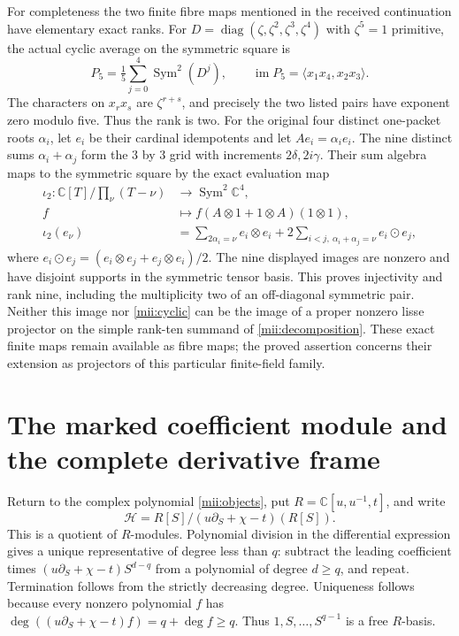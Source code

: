 \documentclass[11pt]{article}
\newcommand{\CC}{\mathbb C}
\newcommand{\Sym}{\operatorname{Sym}}
\newcommand{\im}{\operatorname{im}}
\newcommand{\diag}{\operatorname{diag}}
\begin{document}
For completeness the two finite fibre maps mentioned in the received
continuation have elementary exact ranks. For
$D=\diag(\zeta,\zeta^2,\zeta^3,\zeta^4)$ with $\zeta^5=1$ primitive,
the actual cyclic average on the symmetric square is
\begin{equation}\tag{MII14}\label{mii:cyclic}
 P_5=\tfrac15\sum_{j=0}^4\Sym^2(D^j),\qquad
 \im P_5=\langle x_1x_4,x_2x_3\rangle.
\end{equation}
The characters on $x_rx_s$ are $\zeta^{r+s}$, and precisely the
two listed pairs have exponent zero modulo five. Thus the rank is
two. For the original four distinct one-packet roots $\alpha_i$,
let $e_i$ be their cardinal idempotents and let $A e_i=\alpha_i e_i$.
The nine distinct sums $\alpha_i+\alpha_j$ form the $3$ by $3$
grid with increments $2\delta,2i\gamma$. Their sum algebra maps to
the symmetric square by the exact evaluation map
\begin{equation}\tag{MII15}\label{mii:sumembedding}
 \begin{aligned}
 \iota_2:\CC[T]/\prod_{\nu}(T-\nu)&\longrightarrow\Sym^2\CC^4,\\
 f&\longmapsto f(A\otimes1+1\otimes A)(1\otimes1),\\
 \iota_2(e_\nu)&=
 \sum_{2\alpha_i=\nu}e_i\otimes e_i
 +2\sum_{i<j,\ \alpha_i+\alpha_j=\nu}e_i\odot e_j,
 \end{aligned}
\end{equation}
where $e_i\odot e_j=(e_i\otimes e_j+e_j\otimes e_i)/2$.
The nine displayed images are nonzero and have disjoint supports in
the symmetric tensor basis. This proves injectivity and rank nine,
including the multiplicity two of an off-diagonal symmetric pair.
Neither this image nor \eqref{mii:cyclic} can be the image of a
proper nonzero lisse projector on the simple rank-ten summand of
\eqref{mii:decomposition}. These exact finite maps remain available
as fibre maps; the proved assertion concerns their extension as
projectors of this particular finite-field family.

\section{The marked coefficient module and the complete derivative frame}
Return to the complex polynomial \eqref{mii:objects}, put
$R=\CC[u,u^{-1},t]$, and write
\[
 \mathscr H=R[S]/(u\partial_S+\chi-t)(R[S]).
\]
This is a quotient of $R$-modules. Polynomial division in the
differential expression gives a unique representative of degree less
than $q$: subtract the leading coefficient times
$(u\partial_S+\chi-t)S^{d-q}$ from a polynomial of degree $d\ge q$,
and repeat. Termination follows from the strictly decreasing degree.
Uniqueness follows because every nonzero polynomial $f$ has
$\deg((u\partial_S+\chi-t)f)=q+\deg f\ge q$.
Thus $1,S,\ldots,S^{q-1}$ is a free $R$-basis.
\end{document}
